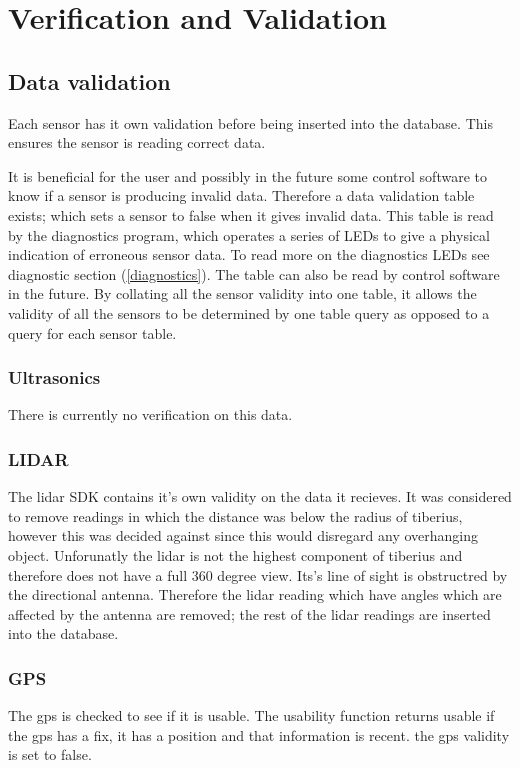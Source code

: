 \section{Verification and Validation}

\subsection{Data validation}
Each sensor has it own validation before being inserted into the database. This ensures the sensor is reading correct data.

It is beneficial for the user and possibly in the future some control software to know if a sensor is producing invalid data. Therefore a data validation table exists; which sets a sensor to false when it gives invalid data. 
\newline
This table is read by the diagnostics program, which operates a series of LEDs to give a physical indication of erroneous sensor data. To read more on the diagnostics LEDs see diagnostic section (\ref{diagnostics}).
\newline
The table can also be read by control software in the future. By collating all the sensor validity into one table, it allows the validity of all the sensors to be determined by one table query as opposed to a query for each sensor table.

\subsubsection{Ultrasonics}
There is currently no verification on this data.

\subsubsection{LIDAR}
The lidar SDK contains it's own validity on the data it recieves. It was considered to remove readings in which the distance was below the radius of tiberius, however this was decided against since this would disregard any overhanging object. 
\newline
Unforunatly the lidar is not the highest component of tiberius and therefore does not have a full 360 degree view. Its's line of sight is obstructred by the directional antenna. Therefore the lidar reading which have angles which are affected by the antenna are removed; the rest of the lidar readings are inserted into the database. 

\subsubsection{GPS}
The gps is checked to see if it is usable. 
The usability function returns usable  if the gps has a fix, it has a position and that information is recent. 
the gps validity is set to false.

